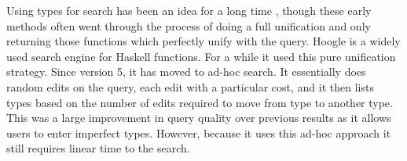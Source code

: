 Using types for search has been an idea for a long time \cite{ReusablePolyType,TypeAsKey},
though these early methods often went through the process of doing a full unification and only returning those functions which perfectly unify with the query.
Hoogle \cite{hoogle} is a widely used search engine for Haskell functions.
For a while it used this pure unification strategy.
Since version 5, it has moved to ad-hoc search.
It essentially does random edits on the query, each edit with a particular cost,
and it then lists types based on the number of edits required to move from type to another type.
This was a large improvement in query quality over previous results as it allows users to enter imperfect types.
However, because it uses this ad-hoc approach it still requires linear time to the search.